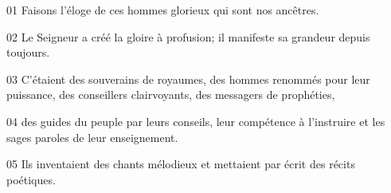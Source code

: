 01 Faisons l’éloge de ces hommes glorieux qui sont nos ancêtres.

02 Le Seigneur a créé la gloire à profusion; il manifeste sa grandeur depuis toujours.

03 C’étaient des souverains de royaumes, des hommes renommés pour leur puissance, des conseillers clairvoyants, des messagers de prophéties,

04 des guides du peuple par leurs conseils, leur compétence à l’instruire et les sages paroles de leur enseignement.

05 Ils inventaient des chants mélodieux et mettaient par écrit des récits poétiques.
